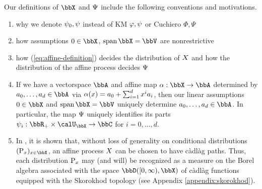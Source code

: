 \begin{remark}
  \label{remark:affine-remarks}
  Our definitions of $\stateSpace$ and $\Psi$ include the following conventions and motivations.
  \begin{enumerate}[label=(\alph*)]
    \item
      {\color{gray} why we denote $\psi_0, \psi$ instead of KM $\varphi, \psi$ or Cuchiero $\Phi, \Psi$}
    \item
      {\color{gray} how assumptions $0 \in \stateSpace$, $\operatorname{span}\stateSpace = \vecSpace$ are nonrestrictive}
    \item
      {\color{gray} how (\ref{eq:affine-definition}) decides the distribution of $X$ and how the distribution of the affine process decides $\Psi$}
    \item
      \label{remark:affine-parts}
      If we have a vectorspace $\bbA$ and affine map $\alpha: \stateSpace \rightarrow \bbA$ determined by $a_0, \ldots, a_d \in \bbA$ via $\alpha(x) = a_0 + \sum_{i=1}^d x^i a_i$, then our linear assumptions $0 \in \stateSpace$ and $\operatorname{span}\stateSpace = \vecSpace$ uniquely determine $a_0, \ldots, a_d \in \bbA$.
      In particular, the map $\Psi$ uniquely identifies its parts $\affPart_i: \bbR_+ \times \boundedSpace \rightarrow \bbC$ for $i=0,\ldots,d$.
    \item
      In \cite[Theorem 1.2.7]{cuchiero2011}, it is shown that, without loss of generality on conditional distributions $(\Prb_\stateVar)_{\stateVar\in\stateSpace}$, an affine process $X$ can be chosen to have c\`adl\`ag paths.
      Thus, each distribution ${\operatorname{P}}_x$ may (and will) be recognized as a measure on the Borel algebra associated with the space $\pathSpace{[0,\infty)}{\stateSpace}$ of c\`adl\`ag functions equipped with the Skorokhod topology (see Appendix \ref{appendix:skorokhod}).
  \end{enumerate}
\end{remark}
